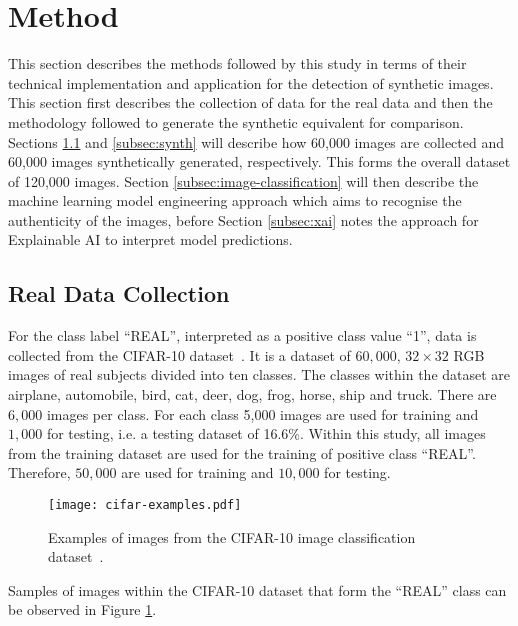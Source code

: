 \documentclass{article}
\begin{document}
\section{Method}
\label{sec:method}
This section describes the methods followed by this study in terms of their technical implementation and application for the detection of synthetic images. This section first describes the collection of data for the real data and then the methodology followed to generate the synthetic equivalent for comparison. Sections \ref{subsec:real} and \ref{subsec:synth} will describe how 60,000 images are collected and 60,000 images synthetically generated, respectively. This forms the overall dataset of 120,000 images. Section \ref{subsec:image-classification} will then describe the machine learning model engineering approach which aims to recognise the authenticity of the images, before Section \ref{subsec:xai} notes the approach for Explainable AI to interpret model predictions. 

\subsection{Real Data Collection}
\label{subsec:real}


For the class label ``REAL'', interpreted as a positive class value ``1'', data is collected from the CIFAR-10 dataset~\cite{krizhevsky2009learning}. It is a dataset of $60,000$, $32 \times 32$ RGB images of real subjects divided into ten classes. The classes within the dataset are airplane, automobile, bird, cat, deer, dog, frog, horse, ship and truck. There are $6,000$ images per class. For each class 5,000 images are used for training and $1,000$ for testing, i.e. a testing dataset of 16.6\%. Within this study, all images from the training dataset are used for the training of positive class ``REAL''. Therefore, $50,000$ are used for training and $10,000$ for testing. 
\begin{figure}
    \centering
    \texttt{[image: cifar-examples.pdf]}
    \caption{Examples of images from the CIFAR-10 image classification dataset~\cite{krizhevsky2009learning}.}
    \label{fig:cifar-examples}
\end{figure}
Samples of images within the CIFAR-10 dataset that form the ``REAL'' class can be observed in Figure \ref{fig:cifar-examples}.
\end{document}

